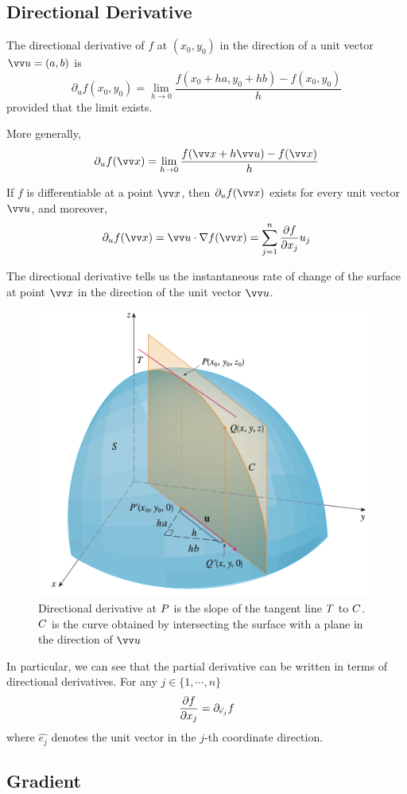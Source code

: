\subsection{Directional Derivative}

The directional derivative of $f$ at $(x_0,y_0)$ in the direction of a unit vector $\vv u = (a,b)$ is
$$
\partial_u f(x_0,y_0) = \lim_{h \to 0} \frac{f(x_0+ha, y_0+hb) - f(x_0,y_0)}{h}
$$
provided that the limit exists.

More generally,
$$
\partial_u f(\vv x) = \lim_{h\to 0} \frac{f(\vv x + h\vv u) - f(\vv x)}{h}
$$

\begin{theorem}
If $f$ is differentiable at a point $\vv x$, then $\partial_u f(\vv x)$ exists for every unit vector $\vv u$, and moreover,
$$
\partial_u f(\vv x) = \vv u \cdot \nabla f(\vv x) = \sum_{j=1}^n \partialderiv{f}{x_j}u_j
$$
\end{theorem}

The directional derivative tells us the instantaneous rate of change of the surface at point $\vv x$ in the direction of the unit vector $\vv u$.

\begin{figure}[h]
    \centering
    \includegraphics[width=0.5\linewidth]{figures/direcitonal-derivative.png}
    \caption{Directional derivative at $\protect P$ is the slope of the tangent line $\protect T$ to $\protect C$. $\protect C$ is the curve obtained by intersecting the surface with a plane in the direction of $\protect \vv u$}
    \label{fig:directional-derivative}
\end{figure}

In particular, we can see that the partial derivative can be written in terms of directional derivatives. For any $j \in \{1,\cdots,n \}$
$$
\frac{\partial f}{\partial x_j} = \partial_{\hat{e_j}}f
$$
where $\hat{e_j}$ denotes the unit vector in the $j$-th coordinate direction.

\subsection{Gradient}

